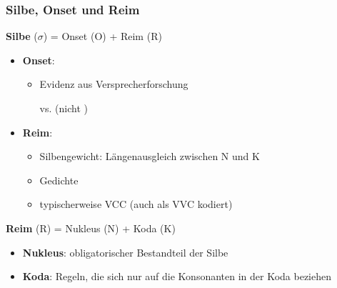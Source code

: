 \begin{frame}
\frametitle{Silbe, Onset und Reim}

\textbf{Silbe} ($\sigma$) = Onset (O) + Reim (R)

\begin{itemize}
\item \textbf{Onset}: 

	\begin{itemize}
		\item Evidenz aus Versprecherforschung
		
		\ea
		 vs.  (nicht )
		\z
	\end{itemize}	

\pause 

\item \textbf{Reim}: 
	\begin{itemize}
		\item Silbengewicht: Längenausgleich zwischen N und K 		
		
		
		\item Gedichte
		\item typischerweise VCC (auch als VVC kodiert)
	\end{itemize}

\end{itemize}

\textbf{Reim} (R) = Nukleus (N) + Koda (K)

	\begin{itemize}
		\item \textbf{Nukleus}: obligatorischer Bestandteil der Silbe
		
		\item \textbf{Koda}: Regeln, die sich nur auf die Konsonanten in der Koda beziehen
	\end{itemize}

\end{frame}


